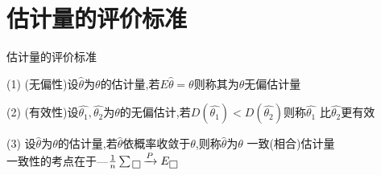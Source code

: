 \documentclass[12pt, a4paper, oneside, UTF8]{ctexbook}
\begin{document}
\section{估计量的评价标准}
\begin{remark}
    估计量的评价标准
    \item[(1)] (无偏性)设$\hat{\theta}$为$\theta$的估计量,若$E\hat{\theta}=\theta$则称其为$\theta$无偏估计量
    \item[(2)] (有效性)设$\hat{\theta_1},\hat{\theta_2}$为$\theta$的无偏估计,若$D(\hat{\theta_1})<D(\hat{\theta_2})$则称$\hat{\theta_1}$
    比$\hat{\theta_2}$更有效 
    \item[(3)] 设$\hat{\theta}$为$\theta$的估计量,若$\hat{\theta}$依概率收敛于$\theta$,则称$\hat{\theta}$为$\theta$
    一致(相合)估计量 \\
    一致性的考点在于---$\frac{1}{n}\sum\fbox{}\xrightarrow{P}E\fbox{}$
\end{remark}
\end{document}
